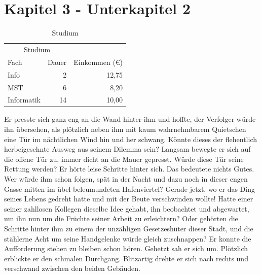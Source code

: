 \section{Kapitel 3 - Unterkapitel 2}
\label{Kapitel_3_-_Unterkapitel_2}
%
\begin{table}[b]
\centering
\begin{tabular}{lrr}
\toprule
\multicolumn{2}{c}{Studium}\\ \cmidrule{1-2}
Fach & Dauer & Einkommen (\euro{})\\
\midrule
Info & 2 & 12,75 \\ \addlinespace
MST & 6 & 8,20 \\ \addlinespace
Informatik & 14 & 10,00\\
\bottomrule
\end{tabular}
\caption{Studium}
\label{table:Studium}
\end{table}
%
Er presste sich ganz eng an die Wand hinter ihm und hoffte, der
Verfolger würde ihn übersehen, als plötzlich neben ihm mit kaum
wahrnehmbarem Quietschen eine Tür im nächtlichen Wind hin und her
schwang. Könnte dieses der flehentlich herbeigesehnte Ausweg aus
seinem Dilemma sein? Langsam bewegte er sich auf die offene Tür
zu, immer dicht an die Mauer gepresst. Würde diese Tür seine
Rettung werden? Er hörte leise Schritte hinter sich. Das bedeutete
nichts Gutes. Wer würde ihm schon folgen, spät in der Nacht und
dazu noch in dieser engen Gasse mitten im übel beleumundeten
Hafenviertel? Gerade jetzt, wo er das Ding seines Lebens gedreht
hatte und mit der Beute verschwinden wollte! Hatte einer seiner
zahllosen Kollegen dieselbe Idee gehabt, ihn beobachtet und
abgewartet, um ihn nun um die Früchte seiner Arbeit zu
erleichtern? Oder gehörten die Schritte hinter ihm zu einem der
unzähligen Gesetzeshüter dieser Stadt, und die stählerne Acht um
seine Handgelenke würde gleich zuschnappen? Er konnte die
Aufforderung stehen zu bleiben schon hören. Gehetzt sah er sich
um. Plötzlich erblickte er den schmalen Durchgang. Blitzartig
drehte er sich nach rechts und verschwand zwischen den beiden
Gebäuden.

